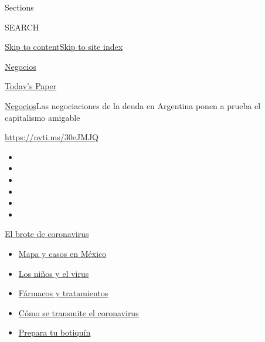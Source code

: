 Sections

SEARCH

\protect\hyperlink{site-content}{Skip to
content}\protect\hyperlink{site-index}{Skip to site index}

\href{https://www.nytimes.com/es/section/negocios}{Negocios}

\href{https://myaccount.nytimes.com/auth/login?response_type=cookie\&client_id=vi}{}

\href{https://www.nytimes.com/section/todayspaper}{Today's Paper}

\href{/es/section/negocios}{Negocios}\textbar{}Las negociaciones de la
deuda en Argentina ponen a prueba el capitalismo amigable

\url{https://nyti.ms/30eJMJQ}

\begin{itemize}
\item
\item
\item
\item
\item
\item
\end{itemize}

\href{https://www.nytimes.com/es/spotlight/coronavirus?action=click\&pgtype=Article\&state=default\&region=TOP_BANNER\&context=storylines_menu}{El
brote de coronavirus}

\begin{itemize}
\tightlist
\item
  \href{https://www.nytimes.com/es/interactive/2020/espanol/america-latina/coronavirus-en-mexico.html?action=click\&pgtype=Article\&state=default\&region=TOP_BANNER\&context=storylines_menu}{Mapa
  y casos en México}
\item
  \href{https://www.nytimes.com/es/2020/07/31/espanol/ciencia-y-tecnologia/ninos-contagio-coronavirus.html?action=click\&pgtype=Article\&state=default\&region=TOP_BANNER\&context=storylines_menu}{Los
  niños y el virus}
\item
  \href{https://www.nytimes.com/es/interactive/2020/science/coronavirus-tratamientos-curas.html?action=click\&pgtype=Article\&state=default\&region=TOP_BANNER\&context=storylines_menu}{Fármacos
  y tratamientos}
\item
  \href{https://www.nytimes.com/es/2020/07/06/espanol/ciencia-y-tecnologia/coronavirus-transmision-aire.html?action=click\&pgtype=Article\&state=default\&region=TOP_BANNER\&context=storylines_menu}{Cómo
  se transmite el coronavirus}
\item
  \href{https://www.nytimes.com/es/2020/07/14/espanol/estilos-de-vida/botiquin-medicina-coronavirus.html?action=click\&pgtype=Article\&state=default\&region=TOP_BANNER\&context=storylines_menu}{Prepara
  tu botiquín}
\end{itemize}

